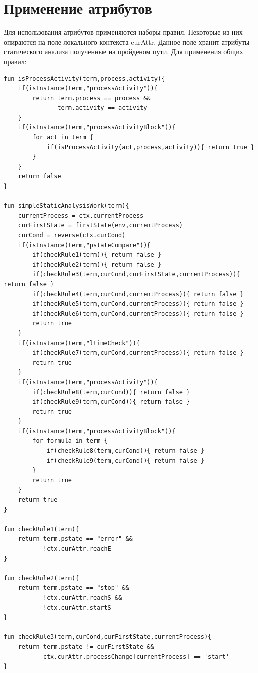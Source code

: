 \section{Применение атрибутов}

Для использования атрибутов применяются наборы правил. Некоторые из них опираются на поле локального контекста curAttr. Данное поле хранит атрибуты статического анализа полученные на пройденом пути. 
Для применения общих правил:

\begin{lstlisting}[style=PseudoStyle,mathescape=true]
fun isProcessActivity(term,process,activity){
    if(isInstance(term,"processActivity")){
        return term.process == process &&
               term.activity == activity
    }
    if(isInstance(term,"processActivityBlock")){
        for act in term {
            if(isProcessActivity(act,process,activity)){ return true }
        }
    }
    return false
}

fun simpleStaticAnalysisWork(term){
    currentProcess = ctx.currentProcess
    curFirstState = firstState(env,currentProcess)
    curCond = reverse(ctx.curCond)
    if(isInstance(term,"pstateCompare")){
        if(checkRule1(term)){ return false }
        if(checkRule2(term)){ return false }
        if(checkRule3(term,curCond,curFirstState,currentProcess)){ return false }
        if(checkRule4(term,curCond,currentProcess)){ return false }
        if(checkRule5(term,curCond,currentProcess)){ return false }
        if(checkRule6(term,curCond,currentProcess)){ return false }
        return true
    }
    if(isInstance(term,"ltimeCheck")){
        if(checkRule7(term,curCond,currentProcess)){ return false }
        return true
    }
    if(isInstance(term,"processActivity")){
        if(checkRule8(term,curCond)){ return false }
        if(checkRule9(term,curCond)){ return false }
        return true
    }
    if(isInstance(term,"processActivityBlock")){
        for formula in term {
            if(checkRule8(term,curCond)){ return false }
            if(checkRule9(term,curCond)){ return false }
        }
        return true
    }
    return true
}

fun checkRule1(term){
    return term.pstate == "error" &&
           !ctx.curAttr.reachE
}

fun checkRule2(term){
    return term.pstate == "stop" &&
           !ctx.curAttr.reachS &&
           !ctx.curAttr.startS
}

fun checkRule3(term,curCond,curFirstState,currentProcess){
    return term.pstate != curFirstState &&
           ctx.curAttr.processChange[currentProcess] == 'start'
}


\end{lstlisting}
